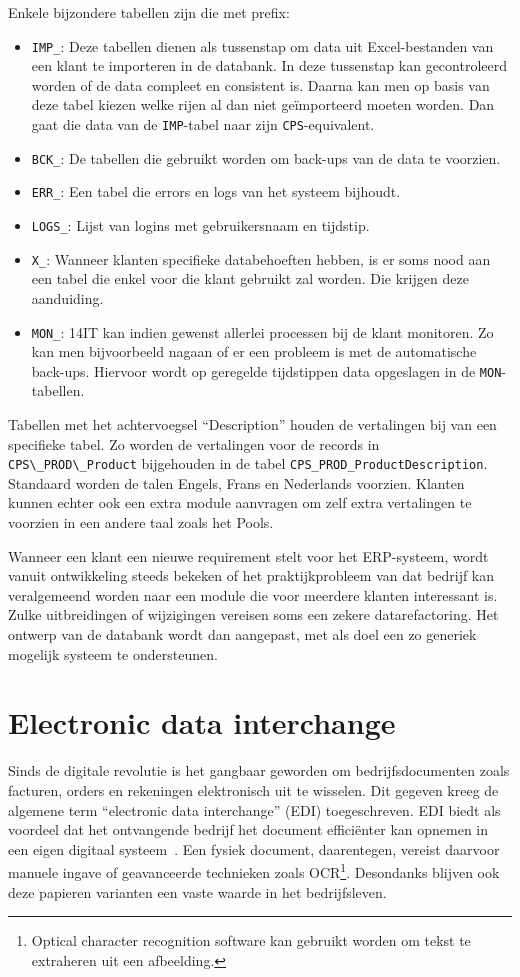 Enkele bijzondere tabellen zijn die met prefix:
\begin{itemize}
	\item \verb*|IMP_|: Deze tabellen dienen als tussenstap om data uit Excel-bestanden van een klant te importeren in de databank. In deze tussenstap kan gecontroleerd worden of de data compleet en consistent is. Daarna kan men op basis van deze tabel kiezen welke rijen al dan niet geïmporteerd moeten worden. Dan gaat die data van de \verb*|IMP|-tabel naar zijn \verb*|CPS|-equivalent.
	\item \verb*|BCK_|: De tabellen die gebruikt worden om back-ups van de data te voorzien.
	\item \verb*|ERR_|: Een tabel die errors en logs van het systeem bijhoudt.
	\item \verb*|LOGS_|: Lijst van logins met gebruikersnaam en tijdstip.
	\item \verb*|X_|: Wanneer klanten specifieke databehoeften hebben, is er soms nood aan een tabel die enkel voor die klant gebruikt zal worden. Die krijgen deze aanduiding.
	\item \verb*|MON_|: 14IT kan indien gewenst allerlei processen bij de klant monitoren. Zo kan men bijvoorbeeld nagaan of er een probleem is met de automatische back-ups. Hiervoor wordt op geregelde tijdstippen data opgeslagen in de \verb*|MON|-tabellen. 
\end{itemize}

Tabellen met het achtervoegsel ``Description'' houden de vertalingen bij van een specifieke tabel. Zo worden de vertalingen voor de records in \verb*|CPS\_PROD\_Product| bijgehouden in de tabel \verb*|CPS_PROD_ProductDescription|. Standaard worden de talen Engels, Frans en Nederlands voorzien. Klanten kunnen echter ook een extra module aanvragen om zelf extra vertalingen te voorzien in een andere taal zoals het Pools.

Wanneer een klant een nieuwe requirement stelt voor het ERP-systeem, wordt vanuit ontwikkeling steeds bekeken of het praktijkprobleem van dat bedrijf kan veralgemeend worden naar een module die voor meerdere klanten interessant is. Zulke uitbreidingen of wijzigingen vereisen soms een zekere datarefactoring. Het ontwerp van de databank wordt dan aangepast, met als doel een zo generiek mogelijk systeem te ondersteunen. 


\section{Electronic data interchange}
\label{sec:electronic-data-interchange}
Sinds de digitale revolutie is het gangbaar geworden om bedrijfsdocumenten zoals facturen, orders en rekeningen elektronisch uit te wisselen. Dit gegeven kreeg de algemene term ``electronic data interchange'' (EDI) toegeschreven. 
EDI biedt als voordeel dat het ontvangende bedrijf het document efficiënter kan opnemen in een eigen digitaal systeem~\autocite{Ford2007}. Een fysiek document, daarentegen, vereist daarvoor manuele ingave of geavanceerde technieken zoals OCR\footnote{Optical character recognition software kan gebruikt worden om tekst te extraheren uit een afbeelding.}. Desondanks blijven ook deze papieren varianten een vaste waarde in het bedrijfsleven.

